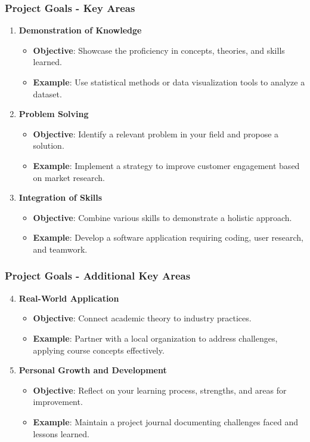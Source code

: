 \documentclass[aspectratio=169]{beamer}
\begin{document}
\begin{frame}[fragile]
    \frametitle{Project Goals - Key Areas}
    \begin{enumerate}
        \item \textbf{Demonstration of Knowledge} 
        \begin{itemize}
            \item \textbf{Objective}: Showcase the proficiency in concepts, theories, and skills learned.
            \item \textbf{Example}: Use statistical methods or data visualization tools to analyze a dataset.
        \end{itemize}

        \item \textbf{Problem Solving}
        \begin{itemize}
            \item \textbf{Objective}: Identify a relevant problem in your field and propose a solution.
            \item \textbf{Example}: Implement a strategy to improve customer engagement based on market research.
        \end{itemize}

        \item \textbf{Integration of Skills}
        \begin{itemize}
            \item \textbf{Objective}: Combine various skills to demonstrate a holistic approach.
            \item \textbf{Example}: Develop a software application requiring coding, user research, and teamwork.
        \end{itemize}
    \end{enumerate}
\end{frame}

\begin{frame}[fragile]
    \frametitle{Project Goals - Additional Key Areas}
    \begin{enumerate}
        \setcounter{enumi}{3}
        \item \textbf{Real-World Application}
        \begin{itemize}
            \item \textbf{Objective}: Connect academic theory to industry practices.
            \item \textbf{Example}: Partner with a local organization to address challenges, applying course concepts effectively.
        \end{itemize}

        \item \textbf{Personal Growth and Development}
        \begin{itemize}
            \item \textbf{Objective}: Reflect on your learning process, strengths, and areas for improvement.
            \item \textbf{Example}: Maintain a project journal documenting challenges faced and lessons learned.
        \end{itemize}
    \end{enumerate}
\end{frame}
\end{document}
